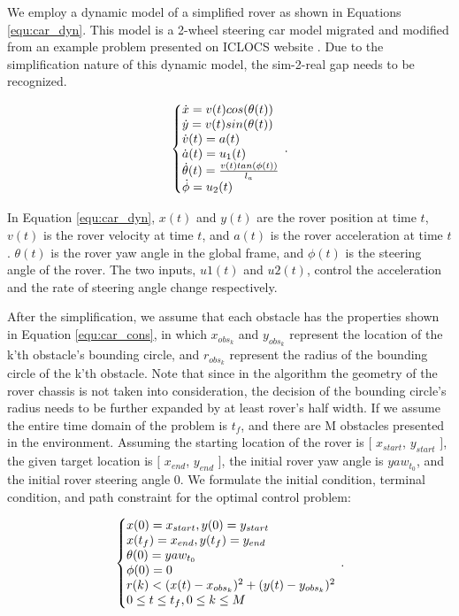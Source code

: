 \documentclass{article}
\begin{document}
We employ a dynamic model of a simplified rover as shown in Equations \ref{equ:car_dyn}. This model is a 2-wheel steering car model migrated and modified from an example problem presented on ICLOCS website \cite{example-parallel}. Due to the simplification nature of this dynamic model, the sim-2-real gap needs to be recognized. 

\begin{equation}
\label{equ:car_dyn}
  \left\{\begin{array}{@{}l@{}}
    \dot{x}=v(t)cos(\theta(t))  \\
    \dot{y}=v(t)sin(\theta(t))  \\
    \dot{v}(t) = a(t) \\
    \dot{a}(t) = u_{1}(t) \\
    \dot{\theta}(t) = \frac{v(t)tan(\phi(t))}{l_{a}} \\
    \dot{\phi}=u_{2}(t) \\
  \end{array}\right.\,.
\end{equation}

In Equation \ref{equ:car_dyn}, $x(t)$ and $y(t)$ are the rover position at time $t$, $v(t)$ is the rover velocity at time $t$, and $a(t)$ is the rover acceleration at time $t$. $\theta(t)$ is the rover yaw angle in the global frame, and $\phi(t)$ is the steering angle of the rover. The two inputs, $u1(t)$ and $u2(t)$, control the acceleration and the rate of steering angle change respectively. 

After the simplification, we assume that each obstacle has the properties shown in Equation \ref{equ:car_cons}, in which \(x_{obs_{k}}\) and \(y_{obs_{k}}\) represent the location of the k'th obstacle's bounding circle, and \(r_{obs_{k}}\) represent the radius of the bounding circle of the k'th obstacle. Note that since in the algorithm the geometry of the rover chassis is not taken into consideration, the decision of the bounding circle's radius needs to be further expanded by at least rover's half width. If we assume the entire time domain of the problem is $t_{f}$, and there are M obstacles presented in the environment. Assuming the starting location of the rover is \([\) \(x_{start}\), \(y_{start}\) \(]\), the given target location is \([\) \(x_{end}\), \(y_{end}\) \(]\), the initial rover yaw angle is $yaw_{t_{0}}$, and the initial rover steering angle $0$. We formulate the initial condition, terminal condition, and path constraint for the optimal control problem: 

\begin{equation}
	\label{equ:car_cons}
	\left\{\begin{array}{@{}l@{}}
		x(0) = x_{start}, y(0) = y_{start}  \\
		x(t_{f}) = x_{end}, y(t_{f}) = y_{end}  \\
		\theta(0) =yaw_{t_{0}}  \\
		\phi(0) = 0 \\
		r(k) < (x(t)-x_{obs_{k}})^2 + (y(t)-y_{obs_{k}})^2  \\
		0 \leq t \leq t_{f}, 0 \leq k \leq M \\
	\end{array}\right.\,.
\end{equation}
\end{document}
